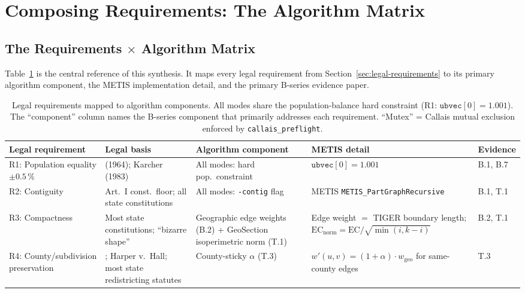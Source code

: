 \section{Composing Requirements: The Algorithm Matrix}
\label{sec:requirements-matrix}

\subsection{The Requirements $\times$ Algorithm Matrix}

Table~\ref{tab:requirements-matrix} is the central reference of this synthesis.
It maps every legal requirement from Section~\ref{sec:legal-requirements} to its
primary algorithm component, the METIS implementation detail, and the primary
B-series evidence paper.

\begin{landscape}
\begin{table}[p]
\centering
\small
\caption{Legal requirements mapped to algorithm components.
  All modes share the population-balance hard constraint (R1: $\mathtt{ubvec}[0]=1.001$).
  The ``component'' column names the B-series component that primarily addresses each requirement.
  ``Mutex'' = Callais mutual exclusion enforced by \texttt{callais\_preflight}.}
\label{tab:requirements-matrix}
\begin{tabular}{p{3.5cm}p{2.5cm}p{3.5cm}p{2.0cm}p{1.5cm}}
\toprule
\textbf{Legal requirement} & \textbf{Legal basis} & \textbf{Algorithm component} & \textbf{METIS detail} & \textbf{Evidence} \\
\midrule
R1: Population equality $\pm 0.5\,\%$ & \wesberry{} (1964); Karcher (1983) & All modes: hard pop.\ constraint & $\mathtt{ubvec}[0]=1.001$ & B.1, B.7 \\[0.5em]

R2: Contiguity & Art.~I const.\ floor; all state constitutions & All modes: \texttt{-contig} flag & METIS \texttt{METIS\_PartGraphRecursive} & B.1, T.1 \\[0.5em]

R3: Compactness & Most state constitutions; \shaw{} ``bizarre shape'' & Geographic edge weights (B.2) + GeoSection isoperimetric norm (T.1) & Edge weight $= $ TIGER boundary length; $\mathrm{EC}_\text{norm} = \mathrm{EC}/\sqrt{\min(i,k-i)}$ & B.2, T.1 \\[0.5em]

R4: County/subdivision preservation & \rucho{}; Harper v.\ Hall; most state redistricting statutes & County-sticky $\alpha$ (T.3) & $w'(u,v)=(1+\alpha)\cdot w_\text{geo}$ for same-county edges & T.3 \\[0.5em]


\end{tabular}
\end{table}
\end{landscape}

